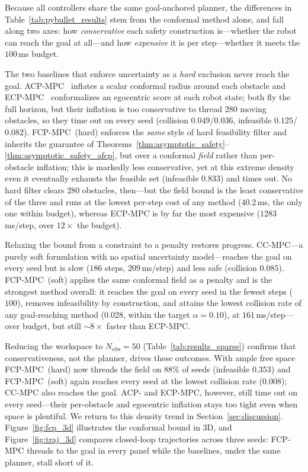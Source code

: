 \documentclass[lettersize,journal]{IEEEtran}
\begin{document}
Because all controllers share the same goal-anchored planner, the differences in
Table~\ref{tab:pybullet_results} stem from the conformal method alone, and fall along two
axes: how \emph{conservative} each safety construction is---whether the robot can reach the
goal at all---and how \emph{expensive} it is per step---whether it meets the $100$\,ms budget.

The two baselines that enforce uncertainty as a \emph{hard} exclusion never reach the goal.
ACP-MPC~\cite{dixit2023adaptive} inflates a scalar conformal radius around each obstacle and
ECP-MPC~\cite{shin2025egocentric} conformalizes an egocentric score at each robot state; both
fly the full horizon, but their inflation is too conservative to thread $280$ moving
obstacles, so they time out on every seed (collision $0.049$/$0.036$, infeasible
$0.125$/$0.082$). FCP-MPC~(hard) enforces the \emph{same} style of hard feasibility filter
and inherits the guarantee of
Theorems~\ref{thm:asymptotic_safety}--\ref{thm:asymptotic_safety_afcp}, but over a conformal
\emph{field} rather than per-obstacle inflation; this is markedly less conservative, yet at
this extreme density even it eventually exhausts the feasible set (infeasible $0.833$) and
times out. No hard filter clears $280$ obstacles, then---but the field bound is the least
conservative of the three and runs at the lowest per-step cost of any method ($40.2$\,ms,
the only one within budget), whereas ECP-MPC is by far the most expensive ($1283$\,ms/step,
over $12\times$ the budget).

Relaxing the bound from a constraint to a penalty restores progress. CC-MPC---a purely soft
formulation with no spatial uncertainty model---reaches the goal on every seed but is slow
($186$ steps, $209$\,ms/step) and less safe (collision $0.085$). FCP-MPC~(soft) applies the
same conformal field as a penalty and is the strongest method overall: it reaches the goal
on every seed in the fewest steps ($100$), removes infeasibility by construction, and attains
the lowest collision rate of any goal-reaching method ($0.028$, within the target
$\alpha=0.10$), at $161$\,ms/step---over budget, but still $\sim\!8\times$ faster than ECP-MPC.

Reducing the workspace to $N_{\mathrm{obs}}=50$ (Table~\ref{tab:results_sparse}) confirms that
conservativeness, not the planner, drives these outcomes. With ample free space FCP-MPC~(hard)
now threads the field on $88\%$ of seeds (infeasible $0.353$) and FCP-MPC~(soft) again reaches
every seed at the lowest collision rate ($0.008$); CC-MPC also reaches the goal. ACP- and
ECP-MPC, however, still time out on every seed---their per-obstacle and egocentric inflation
stays too tight even when space is plentiful. We return to this density trend in
Section~\ref{sec:discussion}.
Figure~\ref{fig:fcp_3d} illustrates the conformal bound in 3D, and
Figure~\ref{fig:traj_3d} compares closed-loop trajectories across three seeds:
FCP-MPC threads to the goal in every panel while the baselines, under the same planner,
stall short of it.
\end{document}
